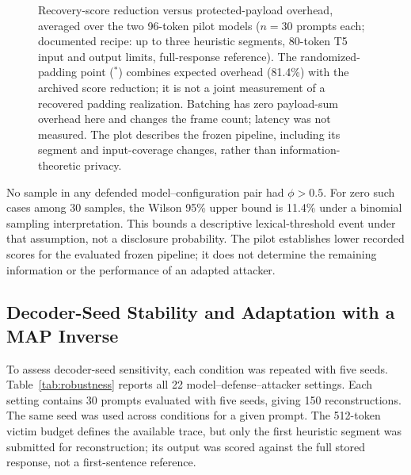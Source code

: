 \documentclass[electronics,article,submit,pdftex,moreauthors]{Definitions/mdpi}
\begin{document}
\begin{figure}[ht]
\centering
{}
\caption{Recovery-score reduction versus protected-payload overhead, averaged over the two 96-token pilot models ($n=30$ prompts each; documented recipe: up to three heuristic segments, 80-token T5 input and output limits, full-response reference). The randomized-padding point ($^{*}$) combines expected overhead (81.4\%) with the archived score reduction; it is not a joint measurement of a recovered padding realization. Batching has zero payload-sum overhead here and changes the frame count; latency was not measured. The plot describes the frozen pipeline, including its segment and input-coverage changes, rather than information-theoretic privacy.}
\label{fig:defense_tradeoff}
\end{figure}

No sample in any defended model--configuration pair had $\phi>0.5$. For zero such cases among 30 samples, the Wilson 95\% upper bound is 11.4\% under a binomial sampling interpretation. This bounds a descriptive lexical-threshold event under that assumption, not a disclosure probability. The pilot establishes lower recorded scores for the evaluated frozen pipeline; it does not determine the remaining information or the performance of an adapted attacker.

\subsection{Decoder-Seed Stability and Adaptation with a MAP Inverse}\label{sec:robustness}
To assess decoder-seed sensitivity, each condition was repeated with five seeds. Table~\ref{tab:robustness} reports all 22 model--defense--attacker settings. Each setting contains 30 prompts evaluated with five seeds, giving 150 reconstructions. The same seed was used across conditions for a given prompt. The 512-token victim budget defines the available trace, but only the first heuristic segment was submitted for reconstruction; its output was scored against the full stored response, not a first-sentence reference.
\end{document}
